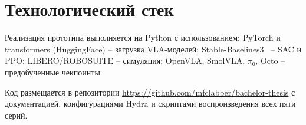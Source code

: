 \section{Технологический стек}
\label{sec:techstack}

    Реализация прототипа выполняется на Python с использованием: PyTorch и transformers (HuggingFace) -- загрузка VLA-моделей; Stable-Baselines3~\cite{stable_baselines3} -- SAC и PPO; LIBERO/ROBOSUITE -- симуляция; OpenVLA, SmolVLA, $\pi_0$, Octo -- предобученные чекпоинты.

    Код размещается в репозитории \url{https://github.com/mfclabber/bachelor-thesis} с документацией, конфигурациями Hydra и скриптами воспроизведения всех пяти серий.

\endinput